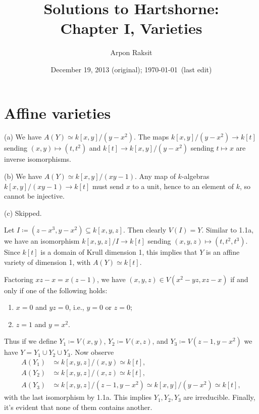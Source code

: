 
%


\title{Solutions to Hartshorne:\\Chapter I, Varieties}
\author{Arpon Raksit}
\date{December 19, 2013 (original); \today\ (last edit)}


\maketitle
\thispagestyle{fancy}


\section{Affine varieties}

\begin{nothing}
  (a) We have $A(Y) \simeq k[x,y]/(y-x^2)$. The maps $k[x,y]/(y-x^2)
  \to k[t]$ sending $(x,y) \mapsto (t,t^2)$ and $k[t] \to
  k[x,y]/(y-x^2)$ sending $t \mapsto x$ are inverse isomorphisms.

  \medskip\noindent
  (b) We have $A(Y) \simeq k[x,y]/(xy-1)$. Any map of $k$-algebras
  $k[x,y]/(xy-1) \to k[t]$ must send $x$ to a unit, hence to an
  element of $k$, so cannot be injective.

  \medskip\noindent
  (c) Skipped.
\end{nothing}

\begin{nothing}
  Let $I \coloneqq (z-x^3,y-x^2) \subseteq k[x,y,z]$. Then clearly
  $V(I) = Y$. Similar to 1.1a, we have an isomorphism $k[x,y,z]/I \to
  k[t]$ sending $(x,y,z) \mapsto (t,t^2,t^3)$. Since $k[t]$ is a
  domain of Krull dimension 1, this implies that $Y$ is an affine
  variety of dimension 1, with $A(Y) \simeq k[t]$.
\end{nothing}

\begin{nothing}
  Factoring $xz-x = x(z-1)$, we have $(x,y,z) \in V(x^2-yz,xz-x)$ if
  and only if one of the following holds:
  \begin{enumerate}
  \item $x = 0$ and $yz = 0$, i.e., $y = 0$ or $z = 0$;
  \item $z = 1$ and $y = x^2$.
  \end{enumerate}
  Thus if we define $Y_1 \coloneqq V(x,y)$, $Y_2 \coloneqq V(x,z)$,
  and $Y_3 \coloneqq V(z-1,y-x^2)$ we have $Y = Y_1 \cup Y_2 \cup
  Y_3$. Now observe
  \begin{align*}
  A(Y_1) &\simeq k[x,y,z]/(x,y) \simeq k[t], \\
  A(Y_2) &\simeq k[x,y,z]/(x,z) \simeq k[t], \\
  A(Y_3) &\simeq k[x,y,z]/(z-1,y-x^2) \simeq k[x,y]/(y-x^2) \simeq
  k[t],
  \end{align*}
  with the last isomorphism by 1.1a. This implies $Y_1,Y_2,Y_3$ are
  irreducible. Finally, it's evident that none of them contains
  another.
\end{nothing}

